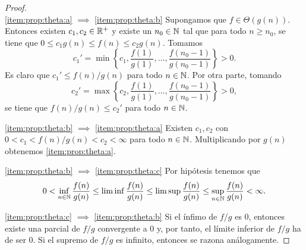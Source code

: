 \documentclass{article}
\begin{document}
\begin{proof} ~\\
 \ref{item:prop:theta:a} $\implies$ \ref{item:prop:theta:b} Supongamos que $f \in \Theta(g(n))$. Entonces existen $c_1,c_2 \in \mathbb{R}^+$ y existe un $n_0 \in \mathbb{N}$ tal que para todo $n \ge n_0$, se tiene que $0 \le c_1g(n) \le f(n) \le c_2g(n)$. Tomamos 
 \[c_1' = \min \left\{c_1,\frac{f(1)}{g(1)},\dots,\frac{f(n_0-1)}{g(n_0-1)}\right\} > 0.\] 
 Es claro que $c_1' \le f(n)/g(n)$ para todo $n \in \mathbb{N}$. Por otra parte, tomando 
 \[c_2' = \max\left\{c_2,\frac{f(1)}{g(1)},\dots,\frac{f(n_0-1)}{g(n_0-1)}\right\} > 0,\] 
 se tiene que $f(n)/g(n) \le c_2'$ para todo $n \in \mathbb{N}$.
 
 \ref{item:prop:theta:b} $\implies$ \ref{item:prop:theta:a} Existen $c_1,c_2$ con $0 < c_1 < f(n)/g(n) < c_2 < \infty$ para todo $n \in \mathbb{N}$. Multiplicando por $g(n)$ obtenemos \ref{item:prop:theta:a}.
 
 \ref{item:prop:theta:b} $\implies$ \ref{item:prop:theta:c} Por hipótesis tenemos que
 \[0 < \inf_{n\in \mathbb{N}} \frac{f(n)}{g(n)} \le \liminf \frac{f(n)}{g(n)} \le \limsup \frac{f(n)}{g(n)} \le \sup_{n\in \mathbb{N}} \frac{f(n)}{g(n)} < \infty.\]
 
 \ref{item:prop:theta:c} $\implies$ \ref{item:prop:theta:b} Si el ínfimo de $f/g$ es 0, entonces existe una parcial de $f/g$ convergente a 0 y, por tanto, el límite inferior de $f/g$ ha de ser 0. Si el supremo de $f/g$ es infinito, entonces se razona análogamente.
\end{proof}
\end{document}
